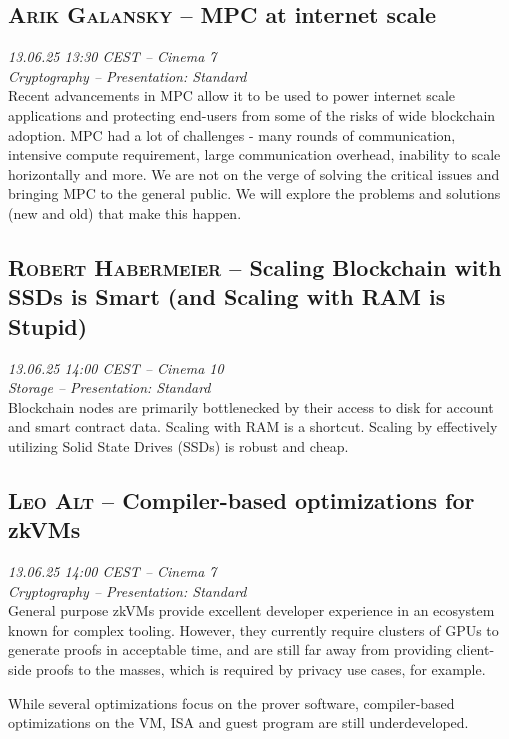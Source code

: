 \clearpage
\subsection {\textsc{Arik Galansky}  -- MPC at internet scale} \noindent \textit {13.06.25 13:30 CEST -- Cinema 7\\ Cryptography -- Presentation: Standard}\\[1em] Recent advancements in MPC allow it to be used to power internet scale applications and protecting end-users from some of the risks of wide blockchain adoption. MPC had a lot of challenges - many rounds of communication, intensive compute requirement, large communication overhead, inability to scale horizontally and more. We are not on the verge of solving the critical issues and bringing MPC to the general public. We will explore the problems and solutions (new and old) that make this happen.

\clearpage
\subsection {\textsc{Robert Habermeier}  -- Scaling Blockchain with SSDs is Smart (and Scaling with RAM is Stupid)} \noindent \textit {13.06.25 14:00 CEST -- Cinema 10\\ Storage -- Presentation: Standard}\\[1em] Blockchain nodes are primarily bottlenecked by their access to disk for account and smart contract data. Scaling with RAM is a shortcut. Scaling by effectively utilizing Solid State Drives (SSDs) is robust and cheap.

\clearpage
\subsection {\textsc{Leo Alt}  -- Compiler-based optimizations for zkVMs} \noindent \textit {13.06.25 14:00 CEST -- Cinema 7\\ Cryptography -- Presentation: Standard}\\[1em] General purpose zkVMs provide excellent developer experience in an ecosystem
known for complex tooling. However, they currently require clusters of GPUs to
generate proofs in acceptable time, and are still far away from providing client-side
proofs to the masses, which is required by privacy use cases, for example.

While several optimizations focus on the prover software, compiler-based
optimizations on the VM, ISA and guest program are still underdeveloped.

